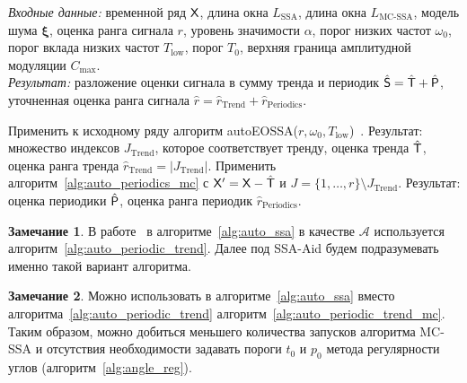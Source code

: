 \documentclass[specialist,
substylefile = spbu_report.rtx,
subf,12pt]{disser}
\newcommand{\Input}{\emph{Входные данные: }}
\newcommand{\Output}{\emph{Результат: }}
\theoremstyle{definition}
\newtheorem{remark}{Замечание}[chapter]
\begin{document}
\begin{algorithm}[!htbp]
	\caption{Модификация алгоритма автоматической идентификации компонент, использующего критерий MC-SSA}\label{alg:auto_periodic_trend_mc}
	\Input временной ряд $\mathsf{X}$, длина окна $L_\text{SSA}$, длина окна $L_\text{MC-SSA}$, модель шума $\bm\xi$, оценка ранга сигнала $r$, уровень значимости $\alpha$, порог низких частот $\omega_0$, порог вклада низких частот $T_{\text{low}}$, порог $T_0$, верхняя граница амплитудной модуляции $C_\text{max}$.\\
	\Output разложение оценки сигнала в сумму тренда и периодик $\hat{\mathsf{S}}=\hat{\mathsf{T}} + \hat{\mathsf{P}}$, уточненная оценка ранга сигнала $\hat{r}=\hat{r}_\text{Trend} + \hat{r}_\text{Periodics}$.
	\begin{algorithmic}[1]
		\State Применить к исходному ряду алгоритм autoEOSSA($r, \omega_0, T_{\text{low}}$)~\cite{autoSSA}. Результат: множество индексов $J_\text{Trend}$, которое соответствует тренду, оценка тренда $\hat{\mathsf{T}}$, оценка ранга тренда $\hat{r}_\text{Trend}=|J_\text{Trend}|$.
		\State Применить алгоритм~\ref{alg:auto_periodics_mc} с $\mathsf{X}^\prime = \mathsf{X} - \hat{\mathsf{T}}$ и $J=\{1,\ldots,r\} \setminus  J_\text{Trend}$. Результат: оценка периодики $\hat{\mathsf{P}}$, оценка ранга периодик $\hat{r}_\text{Periodics}$.
	\end{algorithmic}
\end{algorithm}


\begin{remark}\label{remark:auto_ssa_modified}
	В работе~\cite{Dudnik2025} в алгоритме~\ref{alg:auto_ssa} в качестве $\mathcal{A}$ используется алгоритм~\ref{alg:auto_periodic_trend}. Далее под SSA-Aid будем подразумевать именно такой вариант алгоритма.
\end{remark}
\begin{remark}
	Можно использовать в алгоритме~\ref{alg:auto_ssa} вместо алгоритма~\ref{alg:auto_periodic_trend} алгоритм~\ref{alg:auto_periodic_trend_mc}. Таким образом, можно добиться меньшего количества запусков алгоритма MC-SSA и отсутствия необходимости задавать пороги $t_0$ и $p_0$ метода регулярности углов (алгоритм~\ref{alg:angle_reg}).
\end{remark}
\end{document}
